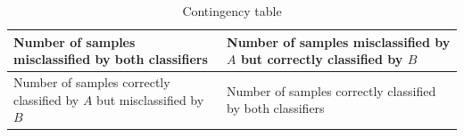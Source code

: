 \begin{table}
    \centering
    \begin{tabularx}{0.7\linewidth}{|X|X|}
        \toprule
        Number of samples misclassified by both classifiers & Number of samples misclassified by $A$ but correctly classified by $B$ \\
        \midrule
        Number of samples correctly classified by $A$ but misclassified by $B$ & Number of samples correctly classified by both classifiers \\
        \bottomrule
    \end{tabularx}
    \caption{Contingency table}
    \label{tab:contingency}
\end{table}